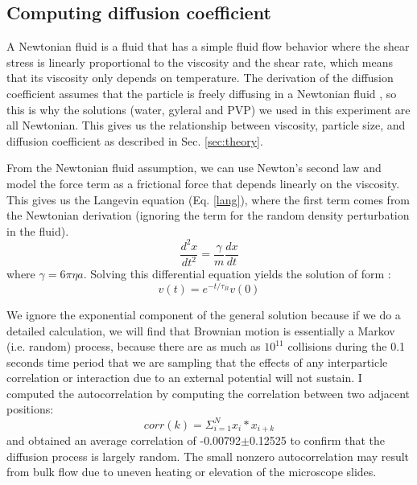 \documentclass[iop,revtex4]{emulateapj_mod}
\begin{document}
\subsection{Computing diffusion coefficient}\label{compD}
\par A Newtonian fluid is a fluid that has a simple fluid flow behavior where the shear stress is linearly proportional to the viscosity and the shear rate, which means that its viscosity only depends on temperature. The derivation of the diffusion coefficient assumes that the particle is freely diffusing in a Newtonian fluid  \cite{Philipse}, so this is why the solutions (water, gyleral and PVP)  we used in this experiment are all Newtonian. This gives us the relationship between viscosity, particle size, and diffusion coefficient as described in Sec. \ref{sec:theory}. 
\par From the Newtonian fluid assumption, we can use Newton's second law and model the force term as a frictional force that depends linearly on the viscosity. This gives us the Langevin equation (Eq. \ref{lang}), where the first term comes from the Newtonian derivation (ignoring the term for the random density perturbation in the fluid).
\begin{equation}
\frac{d^2x}{dt^2} = \frac{\gamma}{m}\frac{dx}{dt}
\label{lang}
\end{equation}where $\gamma  = 6\pi \eta a$.
Solving this differential equation yields the solution of form :
\begin{equation}
v(t) = e^{-t/\tau_B} v(0)
\end{equation}
\par We ignore the exponential component of the general solution because if we do a detailed calculation, we will find that Brownian motion is essentially a Markov (i.e. random) process, because there are as much as $10^{11}$ collisions during the 0.1 seconds time period that we are sampling that the effects of any interparticle correlation or interaction due to an external potential will not sustain. 
I computed the autocorrelation by computing the correlation between two adjacent positions:
\begin{equation}
corr(k) = \Sigma^N_{i=1} x_{i} * x_{i+k}
\end{equation} and obtained an average correlation of -0.00792$\pm $0.12525 to confirm that the diffusion process is largely random. The small nonzero autocorrelation may result from bulk flow due to uneven heating or elevation of the microscope slides. 
\end{document}
